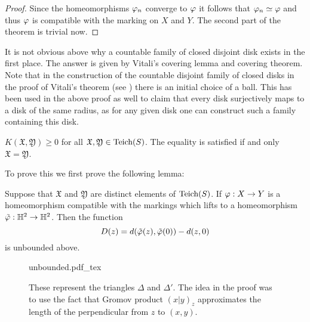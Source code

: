 \begin{proof}
  Since the homeomorphisms $\varphi_n$ converge to $\varphi$ it follows that $\varphi_n\simeq \varphi$ and thus $\varphi$ is compatible with the marking on $X$ and $Y$. The second part of the theorem is trivial now.
\end{proof}
\begin{rem}
  It is not obvious above why a countable family of closed disjoint disk exists in the first place. The answer is given by Vitali's covering lemma and covering theorem. Note that in the construction of the countable disjoint family of closed disks in the proof of Vitali's theorem (see \cite{evans}) there is an initial choice of a ball. This has been used in the above proof as well to claim that every disk surjectively maps to a disk of the same radius, as for any given disk one can construct such a family containing this disk.
\end{rem}
\begin{theorem}\label{thm:Kmetric}
  $K( \mathfrak{X}, \mathfrak{Y})\geq 0$ for all $ \mathfrak{X}, \mathfrak{Y}\in \text{Teich}(S)$. The equality is satisfied if and only $ \mathfrak{X} = \mathfrak{Y}$.
\end{theorem}
To prove this we first prove the following lemma:
\begin{lemma}\label{lem:unbounded}
  Suppose that $ \mathfrak{X}$ and $ \mathfrak{Y}$ are distinct elements of $\text{Teich}(S)$. If $\varphi:X\to Y$ is a homeomorphism compatible with the markings which lifts to a homeomorphism $\tilde{\varphi}:\mathbb{H}^2\to \mathbb{H}^2$. Then the function
  $$D(z) = d(\tilde{\varphi}(z),\tilde{\varphi}(0)) - d(z,0)$$
is unbounded above.
\end{lemma}
\begin{figure}[t]
  \centering
  \def\svgwidth{0.7\textwidth}
  \tiny
  {unbounded.pdf_tex}
  \caption[Proof of \ref{lem:unbounded}]{These represent the triangles $\Delta$ and $\Delta'$. The idea in the proof was to use the fact that Gromov product $(x|y)_z$ approximates the length of the perpendicular from $z$ to $(x,y)$.}
  \label{fig:lem_proof}
\end{figure}
